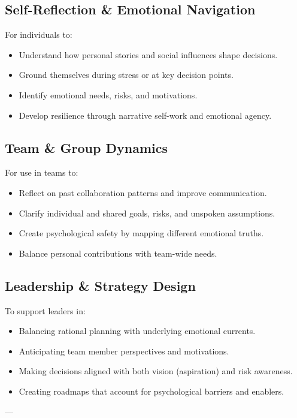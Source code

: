 \documentclass{article}
\begin{document}
\subsection{Self-Reflection \& Emotional Navigation}
For individuals to:
\begin{itemize}[noitemsep,topsep=0pt]
    \item Understand how personal stories and social influences shape decisions.
    \item Ground themselves during stress or at key decision points.
    \item Identify emotional needs, risks, and motivations.
    \item Develop resilience through narrative self-work and emotional agency.
\end{itemize}

\subsection{Team \& Group Dynamics}
For use in teams to:
\begin{itemize}[noitemsep,topsep=0pt]
    \item Reflect on past collaboration patterns and improve communication.
    \item Clarify individual and shared goals, risks, and unspoken assumptions.
    \item Create psychological safety by mapping different emotional truths.
    \item Balance personal contributions with team-wide needs.
\end{itemize}

\subsection{Leadership \& Strategy Design}
To support leaders in:
\begin{itemize}[noitemsep,topsep=0pt]
    \item Balancing rational planning with underlying emotional currents.
    \item Anticipating team member perspectives and motivations.
    \item Making decisions aligned with both vision (aspiration) and risk awareness.
    \item Creating roadmaps that account for psychological barriers and enablers.
\end{itemize}

---
\end{document}
